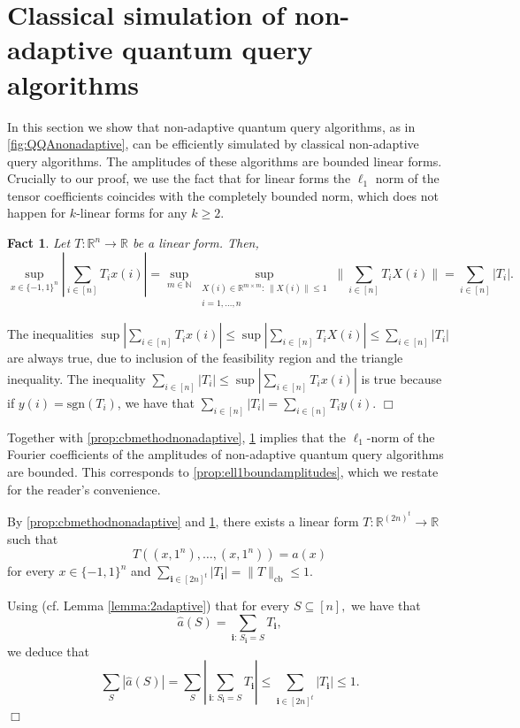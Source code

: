 \documentclass[11pt]{article}
\DeclareMathOperator{\cb}{cb}
\newcommand{\norm}[1]{\|#1\|}
\newcommand{\R}{\mathbb{R}} %
\newcommand{\N}{\mathbb{N}} %
\newcommand{\1}{\mathbf{1}}
\newcommand{\ind}[1]{\mathbf{#1}}
\theoremstyle{plain}
\newtheorem{fact}[theorem]{Fact}
\theoremstyle{definition}
\theoremstyle{remark}
\renewenvironment{proof}[1][]{
    	\begin{trivlist}
     	\item[\hspace{\labelsep}{\em\noindent Proof#1:\/}]}
     	{{\hfill$\Box$}
    	\end{trivlist}
  }
\begin{document}
\section{Classical simulation of non-adaptive quantum query algorithms}
In this section we show that non-adaptive quantum query algorithms, as in \cref{fig:QQAnonadaptive}, can be efficiently simulated by classical non-adaptive query algorithms. The amplitudes of these algorithms are bounded linear forms. Crucially to our proof, we use the fact that for linear forms the $\ell_1$ norm of the tensor coefficients coincides with the completely bounded norm, which does not happen for $k$-linear forms for any $k\geq 2$. 

\begin{fact}\label{fact:boundedlinear}
    Let $T:\R^n\to\R$ be a linear form. Then, 
    \begin{equation*}
        \sup_{x\in\{-1,1\}^n}|\sum_{i\in [n]}T_i x(i)|= \sup_{m\in\N}\sup_{\substack{X(i)\in \R^{m\times m}:\, \norm{X(i)}\leq 1\\i=1,\ldots, n}}\|\sum_{i\in [n]}T_i X(i)\|=\sum_{i\in [n]}|T_{i}|.
    \end{equation*}
\end{fact}
\begin{proof}
    The inequalities
    $\sup|\sum_{i\in [n]}T_i x(i)|\leq \sup|\sum_{i\in [n]}T_i X(i)|\leq \sum_{i\in [n]}|T_{i}|$ are always true, due to inclusion of the feasibility region and the triangle inequality. The inequality $\sum_{i\in [n]}|T_{i}|\leq \sup|\sum_{i\in [n]}T_i x(i)|$ is true because if $y(i)=\text{sgn} (T_i)$, we have that $\sum_{i\in [n]}|T_{i}|= \sum_{i\in [n]}T_iy(i).$
\end{proof}

Together with \cref{prop:cbmethodnonadaptive}, \cref{fact:boundedlinear} implies that the $\ell_1$-norm of the Fourier coefficients of the amplitudes of non-adaptive quantum query algorithms are bounded. This corresponds to \cref{prop:ell1boundamplitudes}, which we restate for the reader's convenience. 

\propell*

\begin{proof}
    By \cref{prop:cbmethodnonadaptive} and \cref{fact:boundedlinear}, there exists a linear form $T:\R^{(2n)^t}\to \R$ such that
    \begin{equation*}
        T((x,1^n),\ldots, (x,1^n))=a(x)
    \end{equation*}
    for every $x\in\{-1,1\}^n$ and $\sum_{\ind i\in [2n]^t}|T_{\ind i}|=\|T\|_{\cb}\leq 1$.
    
    Using (cf. Lemma \ref{lemma:2adaptive}) that for every $S\subseteq [n],$ we have that 
    \begin{equation*}
        \widehat a(S)=\sum_{\ind i:\, S_{\ind i}=S}T_{\ind i},
    \end{equation*} we deduce that $$\sum_S|\widehat a(S)|=\sum_S|\sum_{\ind i:\, S_{\ind i}=S}T_{\ind i}|\leq \sum_{\ind i\in [2n]^t}|T_{\ind i}|\leq 1.$$
\end{proof}
\end{document}
